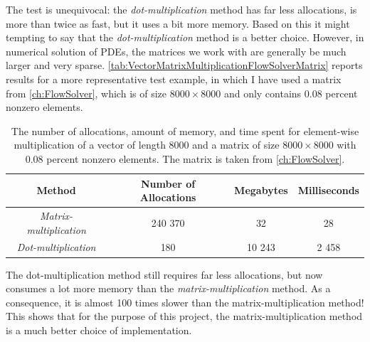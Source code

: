 The test is unequivocal:  the \textit{dot-multiplication} method has far less allocations, is more than twice as fast, but it uses a bit more memory. Based on this it might tempting to say that the \textit{dot-multiplication} method is a better choice. However, in numerical solution of PDEs, the matrices we work with are generally be much larger and very sparse. \autoref{tab:VectorMatrixMultiplicationFlowSolverMatrix} reports results for a more representative test example, in which I have used a matrix from \autoref{ch:FlowSolver}, which is of size $8000\times 8000$ and only contains 0.08 percent nonzero elements.
\begin{table}[H]
    \centering
    \caption{The number of allocations, amount of memory, and time spent for element-wise multiplication of a vector of length 8000 and a matrix of size $8000\times 8000$ with 0.08 percent nonzero elements. The matrix is taken from \autoref{ch:FlowSolver}.}
    \label{tab:VectorMatrixMultiplicationFlowSolverMatrix}
    \def\arraystretch{1.5}
    \begin{tabular}{cccc}
    \textbf{Method} & \textbf{Number of Allocations} & \textbf{Megabytes} & \textbf{Milliseconds} \\
        \hline
         \textit{Matrix-multiplication} & 240 370 & 32 & 28 \\  
         \textit{Dot-multiplication} & 180 & 10 243 & 2 458\\ 
         \hline
    \end{tabular}
\end{table}
The dot-multiplication method still requires far less allocations, but now consumes a lot more memory than the \textit{matrix-multiplication} method. As a consequence, it is almost 100 times slower than the matrix-multiplication method! This shows that for the purpose of this project, the matrix-multiplication method is a much better choice of implementation.


